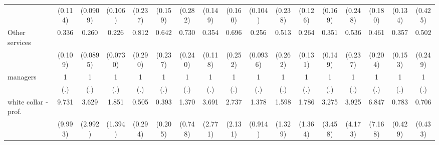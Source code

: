 {\begin{tabular}{l*{16}{c}}
                    &     (0.114)         &    (0.0909)         &     (0.106)         &     (0.237)         &     (0.159)         &     (0.282)         &     (0.149)         &     (0.160)         &     (0.104)         &     (0.238)         &     (0.126)         &     (0.169)         &     (0.248)         &     (0.180)         &     (0.134)         &     (0.425)         \\
[1em]
Other services      &       0.336\sym{***}&       0.260\sym{***}&       0.226\sym{***}&       0.812         &       0.642         &       0.730         &       0.354\sym{**} &       0.696         &       0.256\sym{***}&       0.513         &       0.264\sym{**} &       0.351\sym{*}  &       0.536         &       0.461         &       0.357\sym{*}  &       0.502         \\
                    &     (0.109)         &    (0.0895)         &    (0.0730)         &     (0.290)         &     (0.237)         &     (0.240)         &     (0.118)         &     (0.252)         &    (0.0936)         &     (0.262)         &     (0.131)         &     (0.149)         &     (0.237)         &     (0.204)         &     (0.153)         &     (0.249)         \\
[1em]
managers            &           1         &           1         &           1         &           1         &           1         &           1         &           1         &           1         &           1         &           1         &           1         &           1         &           1         &           1         &           1         &           1         \\
                    &         (.)         &         (.)         &         (.)         &         (.)         &         (.)         &         (.)         &         (.)         &         (.)         &         (.)         &         (.)         &         (.)         &         (.)         &         (.)         &         (.)         &         (.)         &         (.)         \\
[1em]
white collar - prof.&       9.731\sym{*}  &       3.629         &       1.851         &       0.505         &       0.393         &       1.370         &       3.691         &       2.737         &       1.378         &       1.598         &       1.786         &       3.275         &       3.925         &       6.847         &       0.783         &       0.706         \\
                    &     (9.993)         &     (2.992)         &     (1.394)         &     (0.294)         &     (0.205)         &     (0.748)         &     (2.771)         &     (2.131)         &     (0.914)         &     (1.329)         &     (1.364)         &     (3.458)         &     (4.173)         &     (7.168)         &     (0.429)         &     (0.433)         \\

\end{tabular}}
